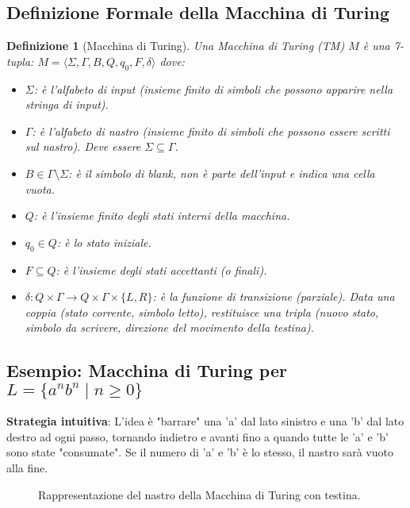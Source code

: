 \documentclass[a4paper]{article}
\newtheorem{definition}{Definizione}
\newcommand{\blankS}{\ensuremath{\square}}
\begin{document}
\subsection{Definizione Formale della Macchina di Turing}
\begin{definition}[Macchina di Turing]
    Una Macchina di Turing (TM) $M$ è una 7-tupla:
    $M = \langle \Sigma, \Gamma, B, Q, q_0, F, \delta \rangle$
    dove:
    \begin{itemize}
        \item $\Sigma$: è l'alfabeto di input (insieme finito di simboli che possono apparire nella stringa di input).
        \item $\Gamma$: è l'alfabeto di nastro (insieme finito di simboli che possono essere scritti sul nastro). Deve essere $\Sigma \subseteq \Gamma$.
        \item $B \in \Gamma \setminus \Sigma$: è il simbolo di blank, non è parte dell'input e indica una cella vuota.
        \item $Q$: è l'insieme finito degli stati interni della macchina.
        \item $q_0 \in Q$: è lo stato iniziale.
        \item $F \subseteq Q$: è l'insieme degli stati accettanti (o finali).
        \item $\delta: Q \times \Gamma \to Q \times \Gamma \times \{L, R\}$: è la funzione di transizione (parziale). Data una coppia (stato corrente, simbolo letto), restituisce una tripla (nuovo stato, simbolo da scrivere, direzione del movimento della testina).
    \end{itemize}
\end{definition}

\subsection{Esempio: Macchina di Turing per $L = \{a^n b^n \mid n \ge 0\}$}
\textbf{Strategia intuitiva}:
L'idea è "barrare" una 'a' dal lato sinistro e una 'b' dal lato destro ad ogni passo, tornando indietro e avanti fino a quando tutte le 'a' e 'b' sono state "consumate". Se il numero di 'a' e 'b' è lo stesso, il nastro sarà vuoto alla fine.

\begin{figure}[h!]
    \centering
    \caption{Rappresentazione del nastro della Macchina di Turing con testina.}
\end{figure}
\end{document}

